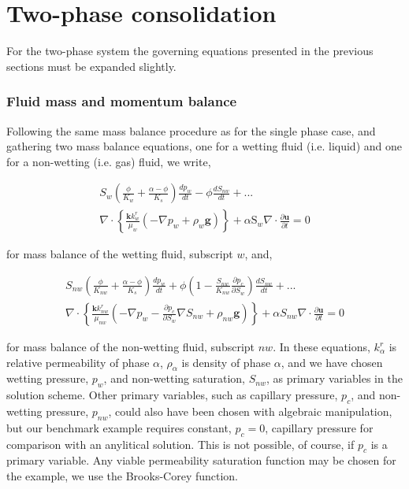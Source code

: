 \section{Two-phase consolidation}

For the two-phase system the governing equations presented in the previous sections must be expanded slightly.

\subsubsection*{Fluid mass and momentum balance}
Following the same mass balance procedure as for the single phase case, and gathering two mass balance equations, one for a wetting fluid (i.e. liquid) and one for a non-wetting (i.e. gas) fluid, we write,

\begin{equation}
\begin{split}
{{S}_{w}}\left( \frac{\phi }{{{K}_{w}}}+\frac{\alpha -\phi }{{{K}_{s}}} \right)\frac{d{{p}_{w}}}{dt}-\phi \frac{d{{S}_{nw}}}{dt}+... \\
\nabla \cdot \left\{ \frac{\mathbf{k}k_{w}^{r}}{{{\mu }_{w}}}\left( -\nabla {{p}_{w}}+{{\rho }_{w}}\mathbf{g} \right) \right\}+\alpha {{\text{S}}_{w}}\nabla \cdot \frac{\partial \mathbf{u}}{\partial t}=0
\end{split}
\label{eq:H2liq}
\end{equation}

for mass balance of the wetting fluid, subscript $w$, and,

\begin{equation}
\begin{split}
{{S}_{nw}}\left( \frac{\phi }{{{K}_{nw}}}+\frac{\alpha -\phi }{{{K}_{s}}} \right)\frac{d{{p}_{w}}}{dt}+\phi \left( 1-\frac{{{S}_{nw}}}{{{K}_{nw}}}\frac{\partial {{p}_{c}}}{\partial {{S}_{w}}} \right)\frac{d{{S}_{nw}}}{dt}+... \\
\nabla \cdot \left\{ \frac{\mathbf{k}k_{nw}^{r}}{{{\mu }_{nw}}}\left( -\nabla {{p}_{w}}-\frac{\partial {{p}_{c}}}{\partial {{S}_{w}}}\nabla {{S}_{nw}}+{{\rho }_{nw}}\mathbf{g} \right) \right\}+\alpha {{S}_{nw}}\nabla \cdot \frac{\partial \mathbf{u}}{\partial t}= 0
\end{split}
\label{eq:H2gas}
\end{equation}

for mass balance of the non-wetting fluid, subscript $nw$. In these equations, $k^{r}_{\alpha }$ is relative permeability of phase $\alpha $, $\rho _{\alpha }$ is density of phase $\alpha $, and we have chosen wetting pressure, $p_w$, and non-wetting saturation, $S_{nw}$, as primary variables in the solution scheme. Other primary variables, such as capillary pressure, $p_c$, and non-wetting pressure, $p_{nw}$, could also have been chosen with algebraic manipulation, but our benchmark example requires constant, $p_c=0$, capillary pressure for comparison with an anylitical solution. This is not possible, of course, if $p_c$ is a primary variable. Any viable permeability saturation function may be chosen for the example, we use the Brooks-Corey function.

